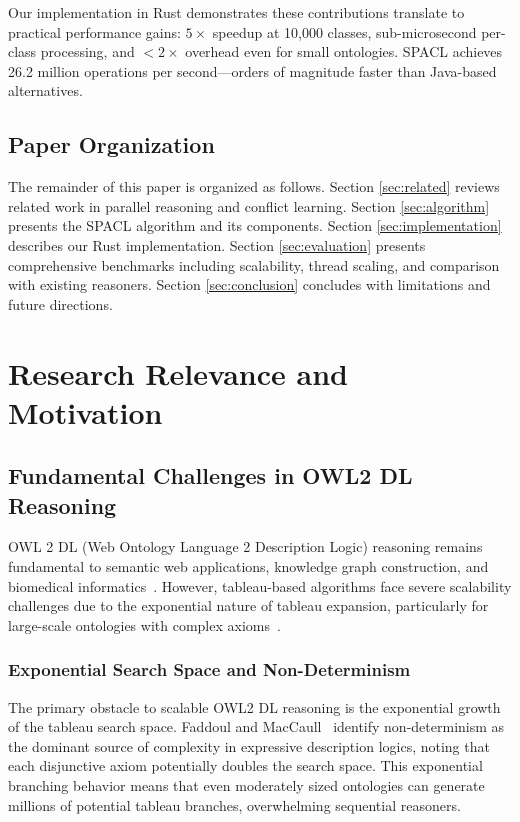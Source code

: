 \documentclass[preprint,12pt]{elsarticle}
\begin{document}
Our implementation in Rust demonstrates these contributions translate to practical performance gains: $5\times$ speedup at 10,000 classes, sub-microsecond per-class processing, and $<2\times$ overhead even for small ontologies. SPACL achieves 26.2 million operations per second---orders of magnitude faster than Java-based alternatives.

\subsection{Paper Organization}
\label{sec:organization}

The remainder of this paper is organized as follows. Section \ref{sec:related} reviews related work in parallel reasoning and conflict learning. Section \ref{sec:algorithm} presents the SPACL algorithm and its components. Section \ref{sec:implementation} describes our Rust implementation. Section \ref{sec:evaluation} presents comprehensive benchmarks including scalability, thread scaling, and comparison with existing reasoners. Section \ref{sec:conclusion} concludes with limitations and future directions.

\section{Research Relevance and Motivation}

\subsection{Fundamental Challenges in OWL2 DL Reasoning}

OWL 2 DL (Web Ontology Language 2 Description Logic) reasoning remains fundamental to semantic web applications, knowledge graph construction, and biomedical informatics~\cite{hitzler2012owl}. However, tableau-based algorithms face severe scalability challenges due to the exponential nature of tableau expansion, particularly for large-scale ontologies with complex axioms~\cite{amir2017cedar}.

\subsubsection{Exponential Search Space and Non-Determinism}

The primary obstacle to scalable OWL2 DL reasoning is the exponential growth of the tableau search space. Faddoul and MacCaull~\cite{faddoul2015fork} identify non-determinism as the dominant source of complexity in expressive description logics, noting that each disjunctive axiom potentially doubles the search space. This exponential branching behavior means that even moderately sized ontologies can generate millions of potential tableau branches, overwhelming sequential reasoners.
\end{document}
